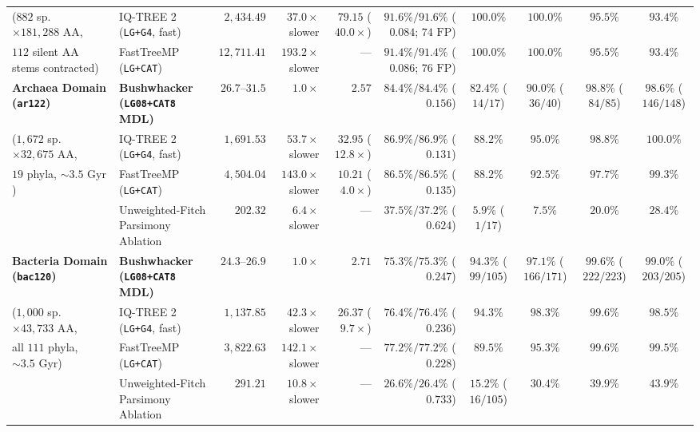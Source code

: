 \documentclass[12pt]{article}
\begin{document}
\begin{table}[H]
{\begin{tabular}{@{}llrrrrcccc@{}}
($882$ sp.\ $\times 181{,}288\text{ AA}$, & IQ-TREE 2 (\texttt{LG+G4}, fast) & $2,434.49$ & $37.0\times$ slower & $79.15$ ($40.0\times$) & $91.6\% / 91.6\%$ ($0.084$; $74\text{ FP}$) & $100.0\%$ & $100.0\%$ & $95.5\%$ & $93.4\%$ \\
$112$ silent AA stems contracted) & FastTreeMP (\texttt{LG+CAT}) & $12,711.41$ & $193.2\times$ slower & --- & $91.4\% / 91.4\%$ ($0.086$; $76\text{ FP}$) & $100.0\%$ & $100.0\%$ & $95.5\%$ & $93.4\%$ \\
\addlinespace
\textbf{Archaea Domain (\texttt{ar122})} & \textbf{Bushwhacker (\texttt{LG08+CAT8} MDL)} & $\mathbf{26.7\text{--}31.5}$ & $\mathbf{1.0\times}$ & $\mathbf{2.57}$ & $\mathbf{84.4\% / 84.4\%}$ ($\mathbf{0.156}$) & $\mathbf{82.4\%}$ ($14/17$) & $\mathbf{90.0\%}$ ($36/40$) & $\mathbf{98.8\%}$ ($84/85$) & $\mathbf{98.6\%}$ ($146/148$) \\
($1,672$ sp.\ $\times 32{,}675\text{ AA}$, & IQ-TREE 2 (\texttt{LG+G4}, fast) & $1,691.53$ & $53.7\times$ slower & $32.95$ ($12.8\times$) & $86.9\% / 86.9\%$ ($0.131$) & $88.2\%$ & $95.0\%$ & $98.8\%$ & $100.0\%$ \\
$19$ phyla, $\sim 3.5\text{ Gyr}$) & FastTreeMP (\texttt{LG+CAT}) & $4,504.04$ & $143.0\times$ slower & $10.21$ ($4.0\times$) & $86.5\% / 86.5\%$ ($0.135$) & $88.2\%$ & $92.5\%$ & $97.7\%$ & $99.3\%$ \\
& Unweighted-Fitch Parsimony Ablation & $202.32$ & $6.4\times$ slower & --- & $37.5\% / 37.2\%$ ($0.624$) & $5.9\%$ ($1/17$) & $7.5\%$ & $20.0\%$ & $28.4\%$ \\
\addlinespace
\textbf{Bacteria Domain (\texttt{bac120})} & \textbf{Bushwhacker (\texttt{LG08+CAT8} MDL)} & $\mathbf{24.3\text{--}26.9}$ & $\mathbf{1.0\times}$ & $\mathbf{2.71}$ & $\mathbf{75.3\% / 75.3\%}$ ($\mathbf{0.247}$) & $\mathbf{94.3\%}$ ($99/105$) & $\mathbf{97.1\%}$ ($166/171$) & $\mathbf{99.6\%}$ ($222/223$) & $\mathbf{99.0\%}$ ($203/205$) \\
($1,000$ sp.\ $\times 43{,}733\text{ AA}$, & IQ-TREE 2 (\texttt{LG+G4}, fast) & $1,137.85$ & $42.3\times$ slower & $26.37$ ($9.7\times$) & $76.4\% / 76.4\%$ ($0.236$) & $94.3\%$ & $98.3\%$ & $99.6\%$ & $98.5\%$ \\
all $111$ phyla, $\sim 3.5\text{ Gyr}$) & FastTreeMP (\texttt{LG+CAT}) & $3,822.63$ & $142.1\times$ slower & --- & $77.2\% / 77.2\%$ ($0.228$) & $89.5\%$ & $95.3\%$ & $99.6\%$ & $99.5\%$ \\
& Unweighted-Fitch Parsimony Ablation & $291.21$ & $10.8\times$ slower & --- & $26.6\% / 26.4\%$ ($0.733$) & $15.2\%$ ($16/105$) & $30.4\%$ & $39.9\%$ & $43.9\%$ \\

\end{tabular}}
\end{table}
\end{document}
